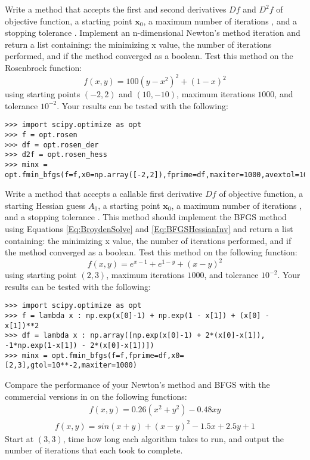 
Write a method that accepts the first and second derivatives $Df$ and $D^2f$ of objective function,  a starting point $\textbf{x}_0$, a maximum number of iterations , and a stopping tolerance .
Implement an n-dimensional Newton's method iteration and return a list containing: the minimizing x value, the number of iterations performed, and if the method converged as a boolean.
Test this method on the Rosenbrock function:
\[
f(x,y) = 100(y-x^2)^2 + (1-x)^2
\]
using starting points $(-2,2)$ and $(10,-10)$, maximum iterations $1000$, and tolerance $10^{-2}$.
Your results can be tested with the following:
\begin{lstlisting}
>>> import scipy.optimize as opt
>>> f = opt.rosen
>>> df = opt.rosen_der
>>> d2f = opt.rosen_hess
>>> minx = opt.fmin_bfgs(f=f,x0=np.array([-2,2]),fprime=df,maxiter=1000,avextol=10**-2)
\end{lstlisting}

Write a method that accepts a callable first derivative $Df$ of objective function, a starting Hessian guess $A_0$, a starting point $\textbf{x}_0$, a maximum number of iterations , and a stopping tolerance .
This method should implement the BFGS method using Equations \ref{Eq:BroydenSolve} and \ref{Eq:BFGSHessianInv} and return a list containing: the minimizing x value, the number of iterations performed, and if the method converged as a boolean.
Test this method on the following function:
\[
f(x,y) = e^{x-1}+e^{1-y}+(x-y)^2
\]
using starting point $(2,3)$, maximum iterations $1000$, and tolerance $10^{-2}$.
Your results can be tested with the following:
\begin{lstlisting}
>>> import scipy.optimize as opt
>>> f = lambda x : np.exp(x[0]-1) + np.exp(1 - x[1]) + (x[0] - x[1])**2
>>> df = lambda x : np.array([np.exp(x[0]-1) + 2*(x[0]-x[1]), -1*np.exp(1-x[1]) - 2*(x[0]-x[1])])
>>> minx = opt.fmin_bfgs(f=f,fprime=df,x0=[2,3],gtol=10**-2,maxiter=1000)
\end{lstlisting}

Compare the performance of your Newton's method and BFGS with the commercial versions in  on the following functions:
\begin{align*}
f(x,y) = 0.26(x^2+y^2) - 0.48xy
\end{align*}
\begin{align*}
f(x,y) = sin(x+y) + (x-y)^2 - 1.5x + 2.5y + 1
\end{align*}
Start at $(3,3)$, time how long each algorithm takes to run, and output the number of iterations that each took to complete.

